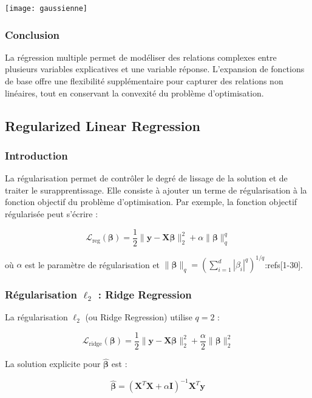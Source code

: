 \documentclass[10pt,a4paper]{article}
\begin{document}
\texttt{[image: gaussienne]}

\subsubsection*{Conclusion}

La régression multiple permet de modéliser des relations complexes entre plusieurs variables explicatives et une variable réponse. L'expansion de fonctions de base offre une flexibilité supplémentaire pour capturer des relations non linéaires, tout en conservant la convexité du problème d'optimisation.

\subsection*{Regularized Linear Regression}

\subsubsection*{Introduction}

La régularisation permet de contrôler le degré de lissage de la solution et de traiter le surapprentissage. Elle consiste à ajouter un terme de régularisation à la fonction objectif du problème d'optimisation. Par exemple, la fonction objectif régularisée peut s'écrire :

$$
\mathcal{L}_{\text{reg}}(\boldsymbol{\beta}) = \frac{1}{2}\|\mathbf{y} - \mathbf{X} \boldsymbol{\beta}\|_{2}^{2} + \alpha \|\boldsymbol{\beta}\|_{q}^{q}
$$

où $\alpha$ est le paramètre de régularisation et $\|\boldsymbol{\beta}\|_{q} = \left(\sum_{i=1}^{d} |\beta_i|^{q}\right)^{1/q}$:refs[1-30].

\subsubsection*{Régularisation $\ell_2$ : Ridge Regression}

La régularisation $\ell_2$ (ou Ridge Regression) utilise $q=2$ :

$$
\mathcal{L}_{\text{ridge}}(\boldsymbol{\beta}) = \frac{1}{2}\|\mathbf{y} - \mathbf{X} \boldsymbol{\beta}\|_{2}^{2} + \frac{\alpha}{2} \|\boldsymbol{\beta}\|_{2}^{2}
$$

La solution explicite pour $\hat{\boldsymbol{\beta}}$ est :

$$
\hat{\boldsymbol{\beta}} = (\mathbf{X}^{T} \mathbf{X} + \alpha \mathbf{I})^{-1} \mathbf{X}^{T} \mathbf{y}
$$
\end{document}
